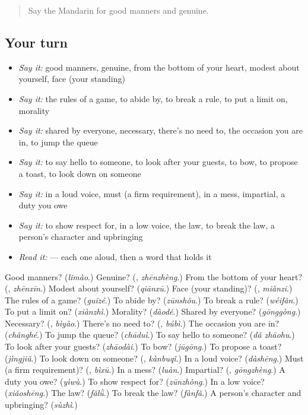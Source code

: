 \label{lesson:ZH-R363-review-358-363}



\begin{quote}
Say the Mandarin for good manners and genuine.
\end{quote}

\subsection*{Your turn}
\begin{itemize}
\raggedright
  \item \emph{Say it:} good manners, genuine, from the bottom of your heart, modest about yourself, face (your standing)
  \item \emph{Say it:} the rules of a game, to abide by, to break a rule, to put a limit on, morality
  \item \emph{Say it:} shared by everyone, necessary, there's no need to, the occasion you are in, to jump the queue
  \item \emph{Say it:} to say hello to someone, to look after your guests, to bow, to propose a toast, to look down on someone
  \item \emph{Say it:} in a loud voice, must (a firm requirement), in a mess, impartial, a duty you owe
  \item \emph{Say it:} to show respect for, in a low voice, the law, to break the law, a person's character and upbringing
  \item \emph{Read it:}    — each one aloud, then a word that holds it
\end{itemize}

\begin{tcolorbox}[breakable,colback=teal!4,colframe=teal!35!black,title={Before you move on}]
Good manners? (\emph{lǐmào}.) Genuine? (\textbf{}, \emph{zhēnzhèng}.) From the bottom of your heart? (\textbf{}, \emph{zhēnxīn}.) Modest about yourself? (\emph{qiānxū}.) Face (your standing)? (\textbf{}, \emph{miànzi}.) The rules of a game? (\emph{guīzé}.) To abide by? (\emph{zūnshǒu}.) To break a rule? (\emph{wéifǎn}.) To put a limit on? (\emph{xiànzhì}.) Morality? (\emph{dàodé}.) Shared by everyone? (\emph{gōnggòng}.) Necessary? (\textbf{}, \emph{bìyào}.) There's no need to? (\textbf{}, \emph{búbì}.) The occasion you are in? (\emph{chǎnghé}.) To jump the queue? (\emph{chāduì}.) To say hello to someone? (\emph{dǎ zhāohu}.) To look after your guests? (\emph{zhāodài}.) To bow? (\emph{jūgōng}.) To propose a toast? (\emph{jìngjiǔ}.) To look down on someone? (\textbf{}, \emph{kànbuqǐ}.) In a loud voice? (\emph{dàshēng}.) Must (a firm requirement)? (\textbf{}, \emph{bìxū}.) In a mess? (\emph{luàn}.) Impartial? (\textbf{}, \emph{gōngzhèng}.) A duty you owe? (\emph{yìwù}.) To show respect for? (\emph{zūnzhòng}.) In a low voice? (\emph{xiǎoshēng}.) The law? (\emph{fǎlǜ}.) To break the law? (\emph{fànfǎ}.) A person's character and upbringing? (\emph{sùzhì}.)
\end{tcolorbox}

